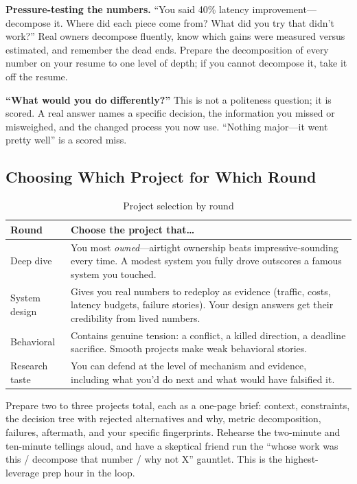 \textbf{Pressure-testing the numbers.} ``You said 40\% latency improvement---decompose it. Where did each piece come from? What did you try that didn't work?'' Real owners decompose fluently, know which gains were measured versus estimated, and remember the dead ends. Prepare the decomposition of every number on your resume to one level of depth; if you cannot decompose it, take it off the resume.

\textbf{``What would you do differently?''} This is not a politeness question; it is scored. A real answer names a specific decision, the information you missed or misweighed, and the changed process you now use. ``Nothing major---it went pretty well'' is a scored miss.

\subsection{Choosing Which Project for Which Round}

\begin{table}[H]
\centering
\small
\caption{Project selection by round}
\label{tab:project_selection}
\begin{tabularx}{\textwidth}{lX}
\toprule
\textbf{Round} & \textbf{Choose the project that\ldots} \\
\midrule
Deep dive & You most \textit{owned}---airtight ownership beats impressive-sounding every time. A modest system you fully drove outscores a famous system you touched. \\
System design & Gives you real numbers to redeploy as evidence (traffic, costs, latency budgets, failure stories). Your design answers get their credibility from lived numbers. \\
Behavioral & Contains genuine tension: a conflict, a killed direction, a deadline sacrifice. Smooth projects make weak behavioral stories. \\
Research taste & You can defend at the level of mechanism and evidence, including what you'd do next and what would have falsified it. \\
\bottomrule
\end{tabularx}
\end{table}

Prepare two to three projects total, each as a one-page brief: context, constraints, the decision tree with rejected alternatives and why, metric decomposition, failures, aftermath, and your specific fingerprints. Rehearse the two-minute and ten-minute tellings aloud, and have a skeptical friend run the ``whose work was this / decompose that number / why not X'' gauntlet. This is the highest-leverage prep hour in the loop.

